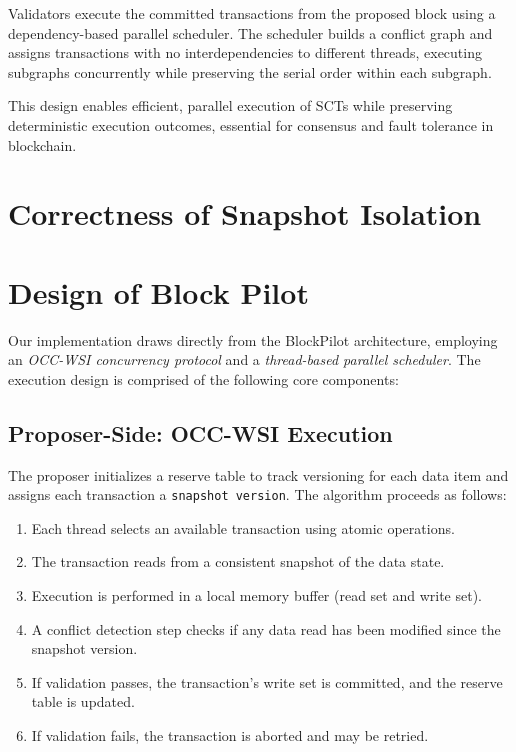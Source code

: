 \documentclass[12pt]{article}
\begin{document}
Validators execute the committed transactions from the proposed block using a dependency-based parallel scheduler. The scheduler builds a conflict graph and assigns transactions with no interdependencies to different threads, executing subgraphs concurrently while preserving the serial order within each subgraph.

This design enables efficient, parallel execution of SCTs while preserving deterministic execution outcomes, essential for consensus and fault tolerance in blockchain.


\section{Correctness of Snapshot Isolation}


\section{Design of Block Pilot}

Our implementation draws directly from the BlockPilot architecture, employing an \textit{OCC-WSI concurrency protocol} and a \textit{thread-based parallel scheduler}. The execution design is comprised of the following core components:

\subsection*{Proposer-Side: OCC-WSI Execution}

The proposer initializes a reserve table to track versioning for each data item and assigns each transaction a \texttt{snapshot version}. The algorithm proceeds as follows:
\begin{enumerate}
    \item Each thread selects an available transaction using atomic operations.
    \item The transaction reads from a consistent snapshot of the data state.
    \item Execution is performed in a local memory buffer (read set and write set).
    \item A conflict detection step checks if any data read has been modified since the snapshot version.
    \item If validation passes, the transaction's write set is committed, and the reserve table is updated.
    \item If validation fails, the transaction is aborted and may be retried.
\end{enumerate}
\end{document}
